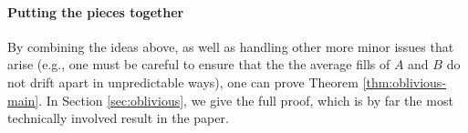 \paragraph{Putting the pieces together}
By combining the ideas above, as well as handling other more minor
issues that arise (e.g., one must be careful to ensure that the the
average fills of $A$ and $B$ do not drift apart in unpredictable
ways), one can prove Theorem \ref{thm:oblivious-main}. In Section
\ref{sec:oblivious}, we give the full proof, which is by far the most
technically involved result in the paper.




